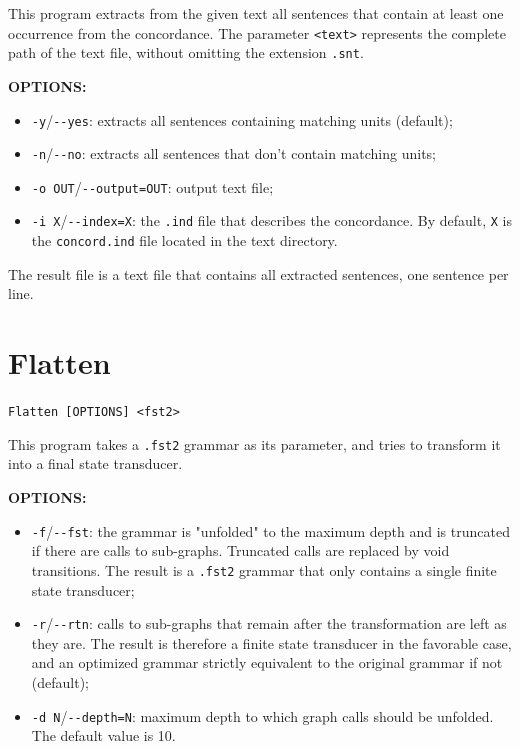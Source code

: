 \bigskip
\noindent This program extracts from the given text all sentences that
contain at least one occurrence from the concordance. The parameter
\verb+<text>+ represents the complete path of the text file, without 
omitting the extension \verb+.snt+.

\bigskip
\noindent \textbf{OPTIONS:}
\begin{itemize}
  \item \verb+-y+/\verb+--yes+: extracts all sentences containing matching units
  (default);
  \item \verb+-n+/\verb+--no+: extracts all sentences that don't contain
  matching units;
  \item \verb+-o OUT+/\verb+--output=OUT+: output text file;
  \item \verb+-i X+/\verb+--index=X+: the \verb+.ind+ file that describes the
        concordance. By default, \verb+X+ is the \verb+concord.ind+ file located
        in the text directory.
\end{itemize}

\bigskip
\noindent The result file is a text file that contains all extracted sentences, one
sentence per line.







\section{Flatten}
\verb+Flatten [OPTIONS] <fst2>+

\bigskip
\noindent This program takes a \verb+.fst2+ grammar as its parameter, and tries to
transform it into a final state transducer. 

\bigskip
\noindent \textbf{OPTIONS:}
\begin{itemize}
  \item \verb+-f+/\verb+--fst+: the grammar is "unfolded" to the maximum depth 
  and is truncated if there are calls to
  sub-graphs. Truncated calls are replaced by void transitions. The result is a
  \verb+.fst2+ grammar that only contains a single finite state transducer;

  \item \verb+-r+/\verb+--rtn+: calls to sub-graphs that remain
  after the transformation are left as they are. The result is therefore a
  finite state transducer in the favorable case, and an optimized grammar
  strictly equivalent to the original grammar if not (default);

  \item \verb+-d N+/\verb+--depth=N+: maximum depth to which graph calls should 
  be unfolded. The default value is 10.
\end{itemize}







